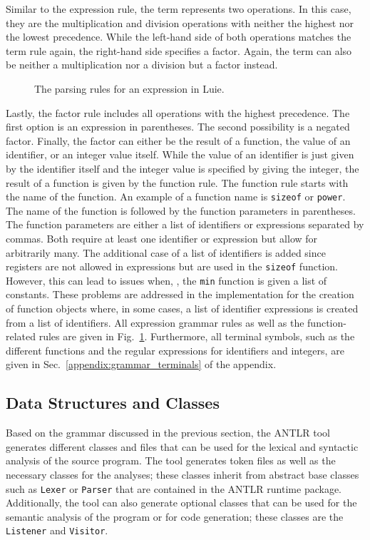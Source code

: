 Similar to the expression rule, the term represents two operations. In this case, they are the multiplication and division operations with neither the highest nor the lowest precedence. While the left-hand side of both operations matches the term rule again, the right-hand side specifies a factor. Again, the term can also be neither a multiplication nor a division but a factor instead.

\begin{figure}[htp]
    \centering
    
    \caption{The parsing rules for an expression in Luie.}
    \label{fig:implementation_expression}
\end{figure}

Lastly, the factor rule includes all operations with the highest precedence. The first option is an expression in parentheses. 
The second possibility is a negated factor. Finally, the factor can either be the result of a function, the value of an identifier, or an integer value itself. While the value of an identifier is just given by the identifier itself and the integer value is specified by giving the integer, the result of a function is given by the function rule. The function rule starts with the name of the function. An example of a function name is \texttt{sizeof} or \texttt{power}. The name of the function is followed by the function parameters in parentheses. The function parameters are either a list of identifiers or expressions separated by commas. Both require at least one identifier or expression but allow for arbitrarily many.
The additional case of a list of identifiers is added since registers are not allowed in expressions but are used in the \texttt{sizeof} function. However, this can lead to issues when, \eg, the \texttt{min} function is given a list of constants. These problems are addressed in the implementation for the creation of function objects where, in some cases, a list of identifier expressions is created from a list of identifiers.
All expression grammar rules as well as the function-related rules are given in Fig.~\ref{fig:implementation_expression}. Furthermore, all terminal symbols, such as the different functions and the regular expressions for identifiers and integers, are given in Sec.~\ref{appendix:grammar_terminals} of the appendix.

\subsection{Data Structures and Classes}
\label{sec:implementation_syntax_dataStructuresClasses}
Based on the grammar discussed in the previous section, the ANTLR tool generates different classes and files that can be used for the lexical and syntactic analysis of the source program. The tool generates token files as well as the necessary classes for the analyses; these classes inherit from abstract base classes such as \texttt{Lexer} or \texttt{Parser} that are contained in the ANTLR runtime package. Additionally, the tool can also generate optional classes that can be used for the semantic analysis of the program or for code generation; these classes are the \texttt{Listener} and \texttt{Visitor}.

